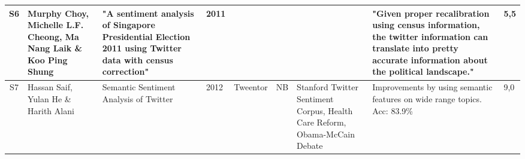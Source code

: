 \begin{sidewaystable}
\begin{longtable}{|c|p{3cm}|p{4cm}|p{0.6cm}|p{1cm}|p{1.3cm}|p{4cm}|p{3cm}|p{0.3cm}|}
    S6 & Murphy Choy, Michelle L.F. Cheong, Ma Nang Laik \& Koo Ping Shung & "A sentiment analysis of Singapore Presidential Election 2011 using Twitter data with census correction" & 2011 &  &  &  & "Given proper recalibration using census information, the twitter information can translate into pretty accurate information about the political landscape."  & 5,5 \\ \hline  
    
    S7 & Hassan Saif, Yulan He \& Harith Alani & Semantic Sentiment Analysis of Twitter & 2012 & Tweentor & NB & Stanford Twitter Sentiment Corpus, Health Care Reform, Obama-McCain Debate & Improvements by using semantic features on wide range topics. Acc: 83.9\%  & 9,0 \\ \hline  
    
    
    \end{longtable}
\end{sidewaystable}

\addtocounter{table}{-1}

